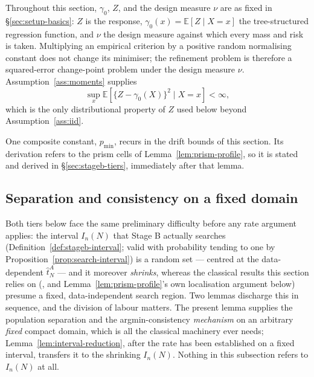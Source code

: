 \documentclass[11pt]{article}
\theoremstyle{plain}
\theoremstyle{definition}
\theoremstyle{remark}
\newcommand{\E}{\mathbb{E}}
\begin{document}
Throughout this section, $\gamma_0$, $Z$, and the design measure $\nu$ are as
fixed in \S\ref{sec:setup-basics}: $Z$ is the response, $\gamma_0(x)=\E[Z\mid
X=x]$ the tree-structured regression function, and $\nu$ the design measure
against which every mass and risk is taken. Multiplying an empirical criterion
by a positive random normalising constant does not change its minimiser; the
refinement problem is therefore a squared-error change-point problem under the
design measure \(\nu\).  Assumption~\ref{ass:moments} supplies
\[
  \sup_x \E\!\left[
    \{Z-\gamma_0(X)\}^2\mid X=x
  \right]<\infty ,
\]
which is the only distributional property of $Z$ used below beyond
Assumption~\ref{ass:iid}.

One composite constant, \(p_{\min}\), recurs in the drift bounds of this
section. Its derivation refers to the prism cells of
Lemma~\ref{lem:prism-profile}, so it is stated and derived in
\S\ref{sec:stageb-tiers}, immediately after that lemma.

\subsection{Separation and consistency on a fixed domain}
\label{sec:stageb-fixed-domain}

Both tiers below face the same preliminary difficulty before any rate
argument applies: the interval $I_n(N)$ that Stage B actually searches
(Definition~\ref{def:stageb-interval}; valid with probability tending to one by
Proposition~\ref{prop:search-interval}) is a random set --- centred at the
data-dependent $\hat t^A_N$ --- and it moreover \emph{shrinks}, whereas the
classical results this section relies on
(\citealt{chan1993,seijosen2011}, and Lemma~\ref{lem:prism-profile}'s own
localisation argument below) presume a fixed, data-independent search
region. Two lemmas discharge this in sequence, and the division of labour
matters. The present lemma supplies the population separation and the
argmin-consistency \emph{mechanism} on an arbitrary \emph{fixed} compact
domain, which is all the classical machinery ever needs;
Lemma~\ref{lem:interval-reduction}, after the rate has been established on a
fixed interval, transfers it to the shrinking $I_n(N)$. Nothing in this
subsection refers to $I_n(N)$ at all.
\end{document}
